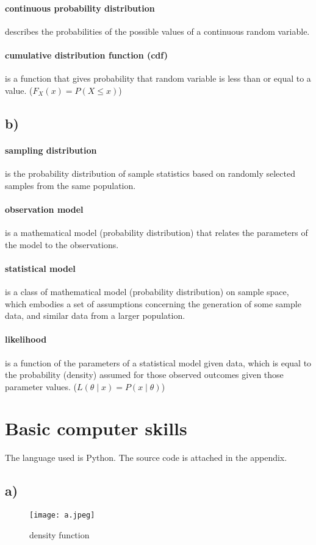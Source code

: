 \documentclass{article}
\begin{document}
      \paragraph*{continuous probability distribution}describes the probabilities of the possible values of a continuous random variable. 
      \paragraph*{cumulative distribution function (cdf)}is a function that gives probability that random variable is less than or equal to a value. ($F_{X}(x) =P(X \leqslant x) $) 
  	\subsection*{b)}
  	 \paragraph*{sampling distribution}is the probability distribution of sample statistics based on randomly selected samples from the same population. 
  	 \paragraph*{observation model}is a mathematical model (probability distribution) that relates the parameters of the model to the observations.
  	 \paragraph*{statistical model}is a class of mathematical model (probability distribution) on sample space, which embodies a set of assumptions concerning the generation of some sample data, and similar data from a larger population.  
  	 \paragraph*{likelihood}is a function of the parameters of a statistical model given data, which is equal to the probability (density) assumed for those observed outcomes given those parameter values. ($L(\theta \mid x)=P(x \mid \theta)$)
  	 
  \section{Basic computer skills} 
   The language used is Python. The source code is attached in the appendix.
    \subsection*{a)}
     \begin{figure}[H]
    	\centering
    	\captionsetup{justification=centering}
    	\texttt{[image: a.jpeg]}
        \caption{density function}
     \end{figure}
  
\end{document}

